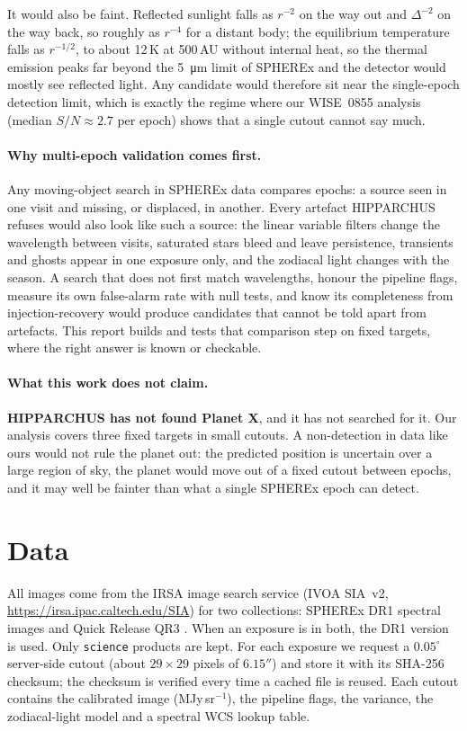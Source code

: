 \documentclass[11pt,a4paper]{article}
\begin{document}
It would also be faint. Reflected sunlight falls as $r^{-2}$ on the way out and $\Delta^{-2}$ on the way back, so roughly
as $r^{-4}$ for a distant body; the equilibrium temperature falls as $r^{-1/2}$, to about 12\,K at 500\,AU without
internal heat, so the thermal emission peaks far beyond the \SI{5}{\micro\meter} limit of SPHEREx and the detector would
mostly see reflected light. Any candidate would therefore sit near the single-epoch detection limit, which is exactly
the regime where our WISE~0855 analysis (median $S/N\approx2.7$ per epoch) shows that a single cutout cannot say much.

\paragraph{Why multi-epoch validation comes first.} Any moving-object search in SPHEREx data compares epochs: a source
seen in one visit and missing, or displaced, in another. Every artefact HIPPARCHUS refuses would also look like such a
source: the linear variable filters change the wavelength between visits, saturated stars bleed and leave persistence,
transients and ghosts appear in one exposure only, and the zodiacal light changes with the season. A search that does
not first match wavelengths, honour the pipeline flags, measure its own false-alarm rate with null tests, and know its
completeness from injection-recovery would produce candidates that cannot be told apart from artefacts. This report
builds and tests that comparison step on fixed targets, where the right answer is known or checkable.

\paragraph{What this work does not claim.} \textbf{HIPPARCHUS has not found Planet X}, and it has not searched for it.
Our analysis covers three fixed targets in small cutouts. A non-detection in data like ours would not rule the planet
out: the predicted position is uncertain over a large region of sky, the planet would move out of a fixed cutout between
epochs, and it may well be fainter than what a single SPHEREx epoch can detect.

\section{Data}
All images come from the IRSA image search service (IVOA SIA~v2, \url{https://irsa.ipac.caltech.edu/SIA}) for two
collections: SPHEREx DR1 spectral images \parencite{irsa_dr1} and Quick Release QR3 \parencite{irsa_qr3}. When an
exposure is in both, the DR1 version is used. Only \texttt{science} products are kept. For each exposure we request a
$0.05^\circ$ server-side cutout (about $29\times29$ pixels of $6.15''$) and store it with its SHA-256 checksum; the
checksum is verified every time a cached file is reused. Each cutout contains the calibrated image (MJy\,sr$^{-1}$),
the pipeline flags, the variance, the zodiacal-light model and a spectral WCS lookup table.
\end{document}
